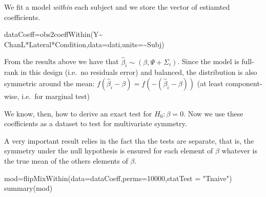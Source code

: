 \documentclass[
]{article}
\newenvironment{Shaded}{\begin{snugshade}}{\end{snugshade}}
\newcommand{\AttributeTok}[1]{\textcolor[rgb]{0.77,0.63,0.00}{#1}}
\newcommand{\DecValTok}[1]{\textcolor[rgb]{0.00,0.00,0.81}{#1}}
\newcommand{\FunctionTok}[1]{\textcolor[rgb]{0.00,0.00,0.00}{#1}}
\newcommand{\NormalTok}[1]{#1}
\newcommand{\OtherTok}[1]{\textcolor[rgb]{0.56,0.35,0.01}{#1}}
\newcommand{\SpecialCharTok}[1]{\textcolor[rgb]{0.00,0.00,0.00}{#1}}
\newcommand{\StringTok}[1]{\textcolor[rgb]{0.31,0.60,0.02}{#1}}
\begin{document}
We fit a model \emph{within} each subject and we store the vector of
estiamted coefficients.

\begin{Shaded}
\begin{Highlighting}[]
\NormalTok{dataCoeff}\OtherTok{=}\FunctionTok{obs2coeffWithin}\NormalTok{(Y}\SpecialCharTok{\textasciitilde{}}\NormalTok{ ChanL}\SpecialCharTok{*}\NormalTok{Lateral}\SpecialCharTok{*}\NormalTok{Condition,}\AttributeTok{data=}\NormalTok{dati,}\AttributeTok{units=}\SpecialCharTok{\textasciitilde{}}\NormalTok{Subj)}
\end{Highlighting}
\end{Shaded}

From the results above we have that
\(\hat\beta_i\sim (\beta,\Psi+\Sigma_i)\). Since the model is full-rank
in this design (i.e.~no residuals error) and balanced, the distribution
is also symmetric around the mean:
\(f(\hat\beta_i-\beta)=f(-(\hat\beta_i-\beta))\) (at least
component-wise, i.e.~for marginal test)

We know, then, how to derive an exact test for \(H_0: \beta=0\). Now we
use these coefficients as a dataset to test for multivariate symmetry.

A very important result relies in the fact tha the tests are separate,
that is, the symmetry under the null hypothesis is ensured for each
element of \(\beta\) whatever is the true mean of the others elements of
\(\beta\).

\begin{Shaded}
\begin{Highlighting}[]
\NormalTok{mod}\OtherTok{=}\FunctionTok{flipMixWithin}\NormalTok{(}\AttributeTok{data=}\NormalTok{dataCoeff,}\AttributeTok{perms=}\DecValTok{10000}\NormalTok{,}\AttributeTok{statTest =} \StringTok{"Tnaive"}\NormalTok{)}
\FunctionTok{summary}\NormalTok{(mod)}
\end{Highlighting}
\end{Shaded}
\end{document}
